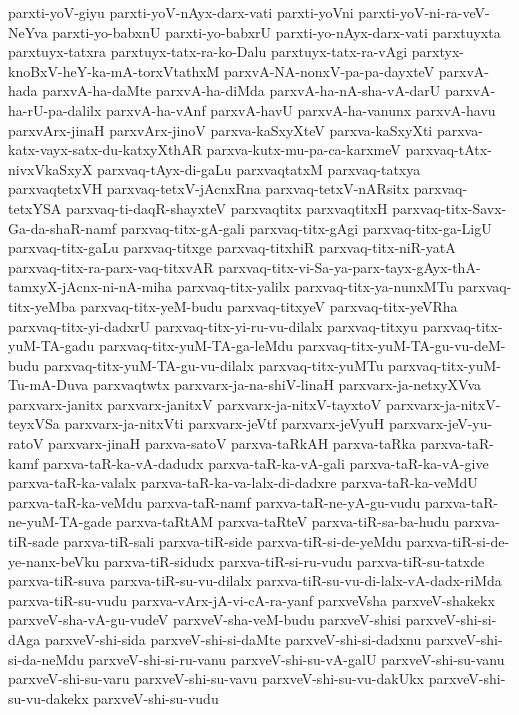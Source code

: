 {parxti-yoV-giyu
parxti-yoV-nAyx-darx-vati
parxti-yoVni
parxti-yoV-ni-ra-veV-NeYva
parxti-yo-babxnU
parxti-yo-babxrU
parxti-yo-nAyx-darx-vati
parxtuyxta
parxtuyx-tatxra
parxtuyx-tatx-ra-ko-Dalu
parxtuyx-tatx-ra-vAgi
parxtyx-knoBxV-heY-ka-mA-torxVtathxM
parxvA-NA-nonxV-pa-pa-dayxteV
parxvA-hada
parxvA-ha-daMte
parxvA-ha-diMda
parxvA-ha-nA-sha-vA-darU
parxvA-ha-rU-pa-dalilx
parxvA-ha-vAnf
parxvA-havU
parxvA-ha-vanunx
parxvA-havu
parxvArx-jinaH
parxvArx-jinoV
parxva-kaSxyXteV
parxva-kaSxyXti
parxva-katx-vayx-satx-du-katxyXthAR
parxva-kutx-mu-pa-ca-karxmeV
parxvaq-tAtx-nivxVkaSxyX
parxvaq-tAyx-di-gaLu
parxvaqtatxM
parxvaq-tatxya
parxvaqtetxVH
parxvaq-tetxV-jAcnxRna
parxvaq-tetxV-nARsitx
parxvaq-tetxYSA
parxvaq-ti-daqR-shayxteV
parxvaqtitx
parxvaqtitxH
parxvaq-titx-Savx-Ga-da-shaR-namf
parxvaq-titx-gA-gali
parxvaq-titx-gAgi
parxvaq-titx-ga-LigU
parxvaq-titx-gaLu
parxvaq-titxge
parxvaq-titxhiR
parxvaq-titx-niR-yatA
parxvaq-titx-ra-parx-vaq-titxvAR
parxvaq-titx-vi-Sa-ya-parx-tayx-gAyx-thA-tamxyX-jAcnx-ni-nA-miha
parxvaq-titx-yalilx
parxvaq-titx-ya-nunxMTu
parxvaq-titx-yeMba
parxvaq-titx-yeM-budu
parxvaq-titxyeV
parxvaq-titx-yeVRha
parxvaq-titx-yi-dadxrU
parxvaq-titx-yi-ru-vu-dilalx
parxvaq-titxyu
parxvaq-titx-yuM-TA-gadu
parxvaq-titx-yuM-TA-ga-leMdu
parxvaq-titx-yuM-TA-gu-vu-deM-budu
parxvaq-titx-yuM-TA-gu-vu-dilalx
parxvaq-titx-yuMTu
parxvaq-titx-yuM-Tu-mA-Duva
parxvaqtwtx
parxvarx-ja-na-shiV-linaH
parxvarx-ja-netxyXVva
parxvarx-janitx
parxvarx-janitxV
parxvarx-ja-nitxV-tayxtoV
parxvarx-ja-nitxV-teyxVSa
parxvarx-ja-nitxVti
parxvarx-jeVtf
parxvarx-jeVyuH
parxvarx-jeV-yu-ratoV
parxvarx-jinaH
parxva-satoV
parxva-taRkAH
parxva-taRka
parxva-taR-kamf
parxva-taR-ka-vA-dadudx
parxva-taR-ka-vA-gali
parxva-taR-ka-vA-give
parxva-taR-ka-valalx
parxva-taR-ka-va-lalx-di-dadxre
parxva-taR-ka-veMdU
parxva-taR-ka-veMdu
parxva-taR-namf
parxva-taR-ne-yA-gu-vudu
parxva-taR-ne-yuM-TA-gade
parxva-taRtAM
parxva-taRteV
parxva-tiR-sa-ba-hudu
parxva-tiR-sade
parxva-tiR-sali
parxva-tiR-side
parxva-tiR-si-de-yeMdu
parxva-tiR-si-de-ye-nanx-beVku
parxva-tiR-sidudx
parxva-tiR-si-ru-vudu
parxva-tiR-su-tatxde
parxva-tiR-suva
parxva-tiR-su-vu-dilalx
parxva-tiR-su-vu-di-lalx-vA-dadx-riMda
parxva-tiR-su-vudu
parxva-vArx-jA-vi-cA-ra-yanf
parxveVsha
parxveV-shakekx
parxveV-sha-vA-gu-vudeV
parxveV-sha-veM-budu
parxveV-shisi
parxveV-shi-si-dAga
parxveV-shi-sida
parxveV-shi-si-daMte
parxveV-shi-si-dadxnu
parxveV-shi-si-da-neMdu
parxveV-shi-si-ru-vanu
parxveV-shi-su-vA-galU
parxveV-shi-su-vanu
parxveV-shi-su-varu
parxveV-shi-su-vavu
parxveV-shi-su-vu-dakUkx
parxveV-shi-su-vu-dakekx
parxveV-shi-su-vudu
}
